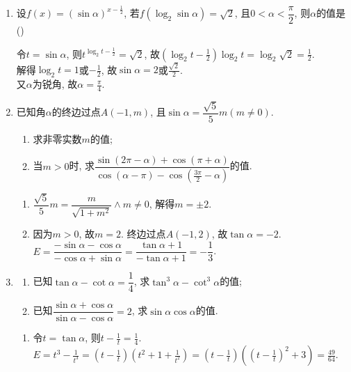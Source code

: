 \begin{enumerate}
\item 设$f(x)=(\sin\alpha)^{x-\frac{1}{2}}$, 若$f(\log_2\sin\alpha)=\sqrt{2}$, 且$0<\alpha<\dfrac{\pi}{2}$, 则$\alpha$的值是\dotfill()
\begin{jieda}
令$t=\sin\alpha$, 则$t^{\log_2t-\frac{1}{2}}=\sqrt{2}$, 故$(\log_2t-\frac{1}{2})\log_2t=\log_2\sqrt{2}=\frac{1}{2}$. \\
解得$\log_2t=1$或$-\frac{1}{2}$, 故$\sin\alpha=2$或$\frac{\sqrt{2}}{2}$. \\
又$\alpha$为锐角, 故$\alpha=\frac{\pi}{4}$. 
\end{jieda}

\item 已知角$\alpha$的终边过点$A(-1,m)$, 且$\sin\alpha=\dfrac{\sqrt{5}}{5}m(m\neq0)$. 
\begin{enumerate}[(1)]
\item 求非零实数$m$的值;
\item 当$m>0$时, 求$\dfrac{\sin(2\pi-\alpha)+\cos(\pi+\alpha)}{\cos(\alpha-\pi)-\cos(\frac{3\pi}{2}-\alpha)}$的值. 
\end{enumerate}
\begin{jieda}
\begin{enumerate}[(1)]
\item $\dfrac{\sqrt{5}}{5}m=\dfrac{m}{\sqrt{1+m^2}}\land m\neq 0$, 解得$m=\pm2$. 
\item 因为$m>0$, 故$m=2$. 终边过点$A(-1,2)$, 故$\tan\alpha=-2$. \\
$E=\dfrac{-\sin\alpha-\cos\alpha}{-\cos\alpha+\sin\alpha}=\dfrac{\tan\alpha+1}{-\tan\alpha+1}=-\dfrac{1}{3}$. 
\end{enumerate}
\end{jieda}


\item
\begin{enumerate}[(1)]
\item 已知$\tan\alpha-\cot\alpha=\dfrac{1}{4}$, 求$\tan^3\alpha-\cot^3\alpha$的值; 
\item 已知$\dfrac{\sin\alpha+\cos\alpha}{\sin\alpha-\cos\alpha}=2$, 求$\sin\alpha\cos\alpha$的值. 
\end{enumerate}
\begin{jieda}
\begin{enumerate}[(1)]
\item 令$t=\tan\alpha$, 则$t-\frac{1}{t}=\frac{1}{4}$. \\
$E=t^3-\frac{1}{t^3}=(t-\frac{1}{t})(t^2+1+\frac{1}{t^2})=(t-\frac{1}{t})((t-\frac{1}{t})^2+3)=\frac{49}{64}$. 


\end{enumerate}
\end{jieda}
\end{enumerate}

